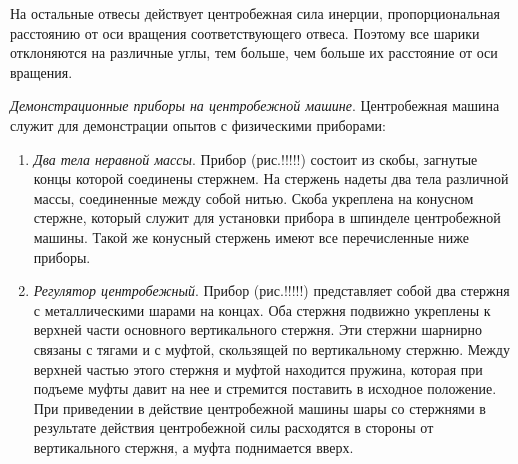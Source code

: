 \documentclass[14pt,a4paper,oneside]{extarticle}	%
\begin{document}
На остальные отвесы действует центробежная сила инерции, пропорциональная расстоянию от оси вращения соответствующего отвеса.
Поэтому все шарики отклоняются на различные углы, тем больше, чем больше их расстояние от оси вращения.

\textit{Демонстрационные приборы на центробежной машине}. 
Центробежная машина служит для демонстрации опытов с физическими приборами:
\begin{enumerate} 
	\item \textit{Два тела неравной массы}. Прибор (рис.!!!!!) состоит из скобы, загнутые концы которой соединены стержнем. На стержень надеты два тела различной массы, соединенные между собой нитью. Скоба укреплена на конусном стержне, который служит для установки прибора в шпинделе центробежной машины. Такой же конусный стержень имеют все перечисленные ниже приборы.
	\item \textit{Регулятор центробежный}. Прибор (рис.!!!!!) представляет собой два стержня с металлическими шарами на концах.
	Оба стержня подвижно укреплены к верхней части основного вертикального стержня. Эти стержни шарнирно связаны с тягами и с муфтой, скользящей по вертикальному стержню. Между верхней частью этого стержня и муфтой находится пружина, которая при подъеме муфты давит на нее и стремится поставить в исходное положение.
	При приведении в действие центробежной машины шары со стержнями в результате действия центробежной силы расходятся в стороны от вертикального стержня, а муфта поднимается вверх.
	\end{enumerate}
\end{document}
